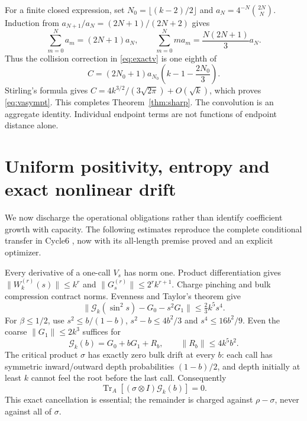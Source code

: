 \documentclass[11pt]{article}
\newcommand{\Tr}{\operatorname{Tr}}
\newcommand{\norm}[1]{\lVert #1\rVert}
\begin{document}
For a finite closed expression, set $N_0=\lfloor(k-2)/2\rfloor$ and
$a_N=4^{-N}\binom{2N}N$. Induction from
$a_{N+1}/a_N=(2N+1)/(2N+2)$ gives
\[
 \sum_{m=0}^N a_m=(2N+1)a_N,\qquad
 \sum_{m=0}^N m a_m=\frac{N(2N+1)}3a_N.
\]
Thus the collision correction in \eqref{eq:exactv} is one eighth of
\begin{equation}\label{eq:closedC}
 C=(2N_0+1)a_{N_0}\left(k-1-\frac{2N_0}3\right).
\end{equation}
Stirling's formula gives
$C=4k^{3/2}/(3\sqrt{2\pi})+O(\sqrt k)$, which proves
\eqref{eq:vasympt}. This completes Theorem~\ref{thm:sharp}.
The convolution is an aggregate identity. Individual endpoint terms
are not functions of endpoint distance alone.

\section{Uniform positivity, entropy and exact nonlinear drift}
\label{sec:transfer}

We now discharge the operational obligations rather than identify
coefficient growth with capacity. The following estimates reproduce
the complete conditional transfer in Cycle6 \cite{Cycle6}, now with its
all-length premise proved and an explicit optimizer.

Every derivative of a one-call $V_s$ has norm one. Product differentiation
gives $\norm{W_k^{(r)}(s)}\le k^r$ and
$\norm{G_s^{(r)}}\le2^rk^{r+1}$. Charge pinching and bulk compression
contract norms. Evenness and Taylor's theorem give
\[
 \norm{\mathcal G_k(\sin^2s)-G_0-s^2G_1}
    \le\tfrac23 k^5s^4.
\]
For $\beta\le1/2$, use $s^2\le b/(1-b)$,
$s^2-b\le4b^2/3$ and $s^4\le16b^2/9$. Even the coarse
$\norm{G_1}\le2k^3$ suffices for
\begin{equation}\label{eq:remainder}
 \mathcal G_k(b)=G_0+bG_1+R_b,\qquad\norm{R_b}\le4k^5b^2.
\end{equation}
The critical product $\sigma$ has exactly zero bulk drift at every $b$:
each call has symmetric inward/outward depth probabilities $(1-b)/2$,
and depth initially at least $k$ cannot feel the root before the last
call. Consequently
\begin{equation}\label{eq:sigmazero}
 \Tr_A[(\sigma\otimes I)\mathcal G_k(b)]=0.
\end{equation}
This exact cancellation is essential; the remainder is charged against
$\rho-\sigma$, never against all of $\sigma$.
\end{document}
